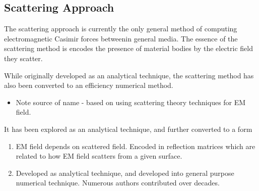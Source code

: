 



\subsection{Scattering Approach}

The scattering approach is currently the only general method of computing 
electromagnetic Casimir forces betweenin general media.  The essence of the scattering method 
is encodes the presence of material bodies by the electric field they scatter.  

While originally developed as an analytical technique, 
the scattering method has also been converted to an efficiency numerical method.  

\begin{itemize}
  \item Note source of name - based on using scattering theory techniques for EM field.
\end{itemize}

It has been explored as an analytical technique,
and further converted to a form 
\begin{enumerate}
\item EM field depends on scattered field.  Encoded in reflection matrices
which are related to how EM field scatters from a given surface.  
\item Developed as analytical technique, and developed into general purpose numerical technique.
Numerous authors contributed over decades.
\end{enumerate}

